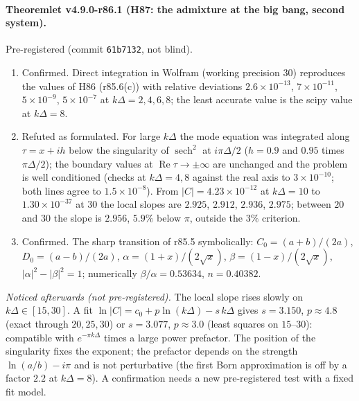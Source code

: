 \paragraph{Theoremlet v4.9.0-r86.1 (H87: the admixture at the big bang, second system).}
Pre-registered (commit \texttt{61b7132}, not blind).
\begin{enumerate}[leftmargin=2em]
\item[(a)] Confirmed.  Direct integration in Wolfram (working precision 30) reproduces the values of H86 (r85.6(c)) with relative deviations
\(2.6\times10^{-13}\), \(7\times10^{-11}\), \(5\times10^{-9}\), \(5\times10^{-7}\) at \(k\Delta=2,4,6,8\); the least accurate value is the scipy value at \(k\Delta=8\).
\item[(b)] Refuted as formulated.  For large \(k\Delta\) the mode equation was integrated along \(\tau=x+ih\) below the singularity of
\(\operatorname{sech}^2\) at \(i\pi\Delta/2\) (\(h=0.9\) and \(0.95\) times \(\pi\Delta/2\)); the boundary values at \(\operatorname{Re}\tau\to\pm\infty\) are unchanged and the
problem is well conditioned (checks at \(k\Delta=4,8\) against the real axis to \(3\times10^{-10}\); both lines agree to \(1.5\times10^{-8}\)).  From
\(|C|=4.23\times10^{-12}\) at \(k\Delta=10\) to \(1.30\times10^{-37}\) at \(30\) the local slopes are \(2.925\), \(2.912\), \(2.936\), \(2.975\); between \(20\) and \(30\) the
slope is \(2.956\), \(5.9\%\) below \(\pi\), outside the \(3\%\) criterion.
\item[(c)] Confirmed.  The sharp transition of r85.5 symbolically: \(C_0=(a+b)/(2a)\), \(D_0=(a-b)/(2a)\), \(\alpha=(1+x)/(2\sqrt x)\),
\(\beta=(1-x)/(2\sqrt x)\), \(|\alpha|^2-|\beta|^2=1\); numerically \(\beta/\alpha=0.53634\), \(n=0.40382\).
\end{enumerate}
\emph{Noticed afterwards (not pre-registered).}  The local slope rises slowly on \(k\Delta\in[15,30]\).  A fit
\(\ln|C|=c_0+p\ln(k\Delta)-s\,k\Delta\) gives \(s=3.150\), \(p\approx4.8\) (exact through \(20,25,30\)) or \(s=3.077\), \(p\approx3.0\) (least squares on
\(15\)--\(30\)): compatible with \(e^{-\pi k\Delta}\) times a large power prefactor.  The position of the singularity fixes the exponent; the prefactor
depends on the strength \(\ln(a/b)-i\pi\) and is not perturbative (the first Born approximation is off by a factor \(2.2\) at \(k\Delta=8\)).  A
confirmation needs a new pre-registered test with a fixed fit model.

